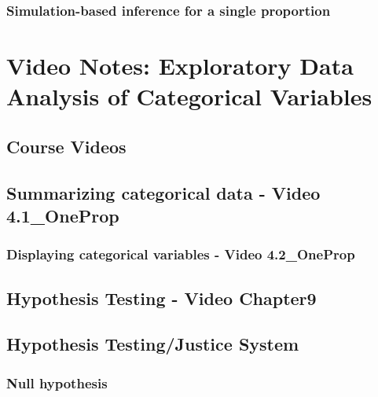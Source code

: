 \documentclass[
]{report}
\begin{document}
\subsubsection{Simulation-based inference for a single proportion}\label{simulation-based-inference-for-a-single-proportion}

\section{Video Notes: Exploratory Data Analysis of Categorical Variables}\label{video-notes-exploratory-data-analysis-of-categorical-variables}

\subsection{Course Videos}\label{course-videos-2}

\subsection*{Summarizing categorical data - Video 4.1\_OneProp}\label{summarizing-categorical-data---video-4.1_oneprop}

\subsubsection*{Displaying categorical variables - Video 4.2\_OneProp}\label{displaying-categorical-variables---video-4.2_oneprop}

\subsection*{Hypothesis Testing - Video Chapter9}\label{hypothesis-testing---video-chapter9}

\subsection*{Hypothesis Testing/Justice System}\label{hypothesis-testingjustice-system}

\subsubsection*{Null hypothesis}\label{null-hypothesis}
\end{document}
